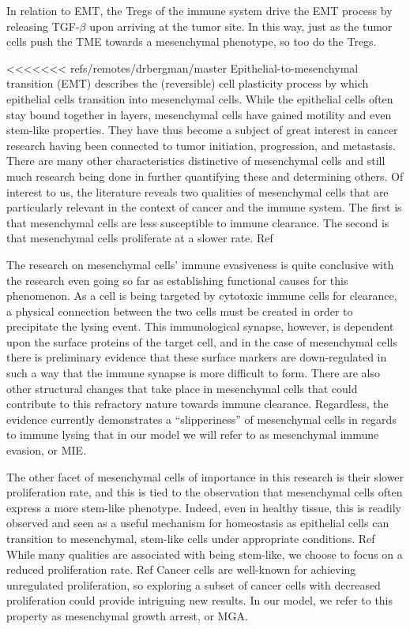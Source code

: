 \documentclass{article}
\begin{document}
In relation to EMT, the Tregs of the immune system drive the EMT process by releasing TGF-$\beta$ upon arriving at the tumor site\cite{terry2017new}.
In this way, just as the tumor cells push the TME towards a mesenchymal phenotype, so too do the Tregs.

<<<<<<< refs/remotes/drbergman/master
Epithelial-to-mesenchymal transition (EMT) describes the (reversible) cell plasticity process by which epithelial cells transition into mesenchymal cells.
While the epithelial cells often stay bound together in layers, mesenchymal cells have gained motility and even stem-like properties\cite{nieto2016emt}.
They have thus become a subject of great interest in cancer research having been connected to tumor initiation, progression, and metastasis\cite{nieto2016emt}.
There are many other characteristics distinctive of mesenchymal cells and still much research being done in further quantifying these and determining others.
Of interest to us, the literature reveals two qualities of mesenchymal cells that are particularly relevant in the context of cancer and the immune system.
The first is that mesenchymal cells are less susceptible to immune clearance\cite{terry2017new}. 
%
The second is that mesenchymal cells proliferate at a slower rate. Ref

The research on mesenchymal cells' immune evasiveness is quite conclusive with the research even going so far as establishing functional causes for this phenomenon.
As a cell is being targeted by cytotoxic immune cells for clearance, a physical connection between the two cells must be created in order to precipitate the lysing event.
This immunological synapse, however, is dependent upon the surface proteins of the target cell, and in the case of mesenchymal cells there is preliminary evidence that these surface markers are down-regulated in such a way that the immune synapse is more difficult to form\cite{terry2017new}.
There are also other structural changes that take place in mesenchymal cells that could contribute to this refractory nature towards immune clearance.
Regardless, the evidence currently demonstrates a ``slipperiness'' of mesenchymal cells in regards to immune lysing that in our model we will refer to as mesenchymal immune evasion, or MIE.

The other facet of mesenchymal cells of importance in this research is their slower proliferation rate, and this is tied to the observation that mesenchymal cells often express a more stem-like phenotype.
Indeed, even in healthy tissue, this is readily observed and seen as a useful mechanism for homeostasis as epithelial cells can transition to mesenchymal, stem-like cells under appropriate conditions. Ref
While many qualities are associated with being stem-like, we choose to focus on a reduced proliferation rate. Ref
Cancer cells are well-known for achieving unregulated proliferation, so exploring a subset of cancer cells with decreased proliferation could provide intriguing new results.
In our model, we refer to this property as mesenchymal growth arrest, or MGA.
\end{document}
